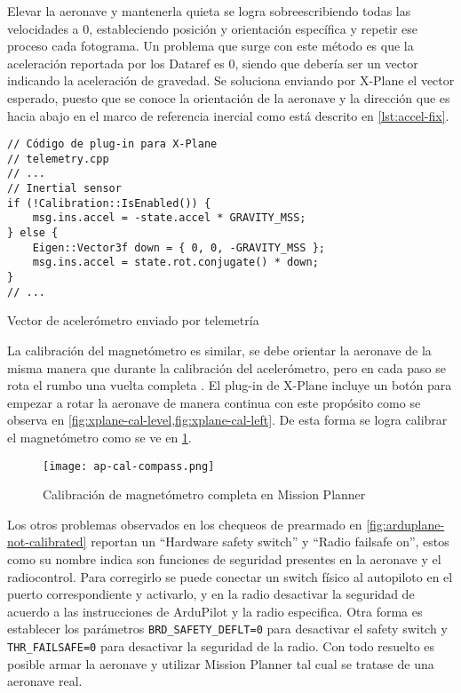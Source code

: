 Elevar la aeronave y mantenerla quieta se logra sobreescribiendo todas las velocidades a 0, estableciendo posición y orientación específica y repetir ese proceso cada fotograma. Un problema que surge con este método es que la aceleración reportada por los Dataref es 0, siendo que debería ser un vector indicando la aceleración de gravedad. Se soluciona enviando por X-Plane el vector esperado, puesto que se conoce la orientación de la aeronave y la dirección que es hacia abajo en el marco de referencia inercial como está descrito en \cref{lst:accel-fix}.

\begin{listing}[h]
    \begin{verbatim}
// Código de plug-in para X-Plane
// telemetry.cpp
// ...
// Inertial sensor
if (!Calibration::IsEnabled()) {
    msg.ins.accel = -state.accel * GRAVITY_MSS;
} else {
    Eigen::Vector3f down = { 0, 0, -GRAVITY_MSS };
    msg.ins.accel = state.rot.conjugate() * down;
}
// ...
    \end{verbatim}
    \caption{Vector de acelerómetro enviado por telemetría}
    \label{lst:accel-fix}
\end{listing}

La calibración del magnetómetro es similar, se debe orientar la aeronave de la misma manera que durante la calibración del acelerómetro, pero en cada paso se rota el rumbo una vuelta completa \cite{arduplane-compass}. El plug-in de X-Plane incluye un botón para empezar a rotar la aeronave de manera continua con este propósito como se observa en \cref{fig:xplane-cal-level,fig:xplane-cal-left}. De esta forma se logra calibrar el magnetómetro como se ve en \cref{fig:ap-cal-compass}.

\begin{figure}[h]
    \centering
    \texttt{[image: ap-cal-compass.png]}
    \caption{Calibración de magnetómetro completa en Mission Planner}
    \label{fig:ap-cal-compass}
\end{figure}

Los otros problemas observados en los chequeos de prearmado en \cref{fig:arduplane-not-calibrated} reportan un ``Hardware safety switch'' y ``Radio failsafe on'', estos como su nombre indica son funciones de seguridad presentes en la aeronave y el radiocontrol. Para corregirlo se puede conectar un switch físico al autopiloto en el puerto correspondiente y activarlo, y en la radio desactivar la seguridad de acuerdo a las instrucciones de ArduPilot y la radio especifica. Otra forma es establecer los parámetros \texttt{BRD\_SAFETY\_DEFLT=0} para desactivar el safety switch y \texttt{THR\_FAILSAFE=0} para desactivar la seguridad de la radio. Con todo resuelto es posible armar la aeronave y utilizar Mission Planner tal cual se tratase de una aeronave real.

